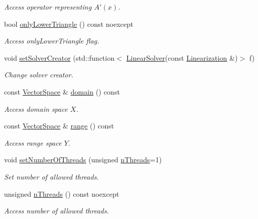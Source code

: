 \begin{DoxyCompactItemize}
\begin{DoxyCompactList}\small\item\em Access operator representing $A'(x)$. \end{DoxyCompactList}\item 
bool \hyperlink{classSpacy_1_1Kaskade_1_1C1Operator_adb85b50e1cc87fb342412560353c2f73_adb85b50e1cc87fb342412560353c2f73}{only\+Lower\+Triangle} () const noexcept
\begin{DoxyCompactList}\small\item\em Access only\+Lower\+Triangle flag. \end{DoxyCompactList}\item 
void \hyperlink{classSpacy_1_1Kaskade_1_1C1Operator_aa0c69955542db6b0f61807181874b4d9_aa0c69955542db6b0f61807181874b4d9}{set\+Solver\+Creator} (std\+::function$<$ \hyperlink{namespaceSpacy_a7d5cd1c6fb9dd85aa345b536caf30bba_a7d5cd1c6fb9dd85aa345b536caf30bba}{Linear\+Solver}(const \hyperlink{classSpacy_1_1Kaskade_1_1LinearOperator}{Linearization} \&)$>$ f)
\begin{DoxyCompactList}\small\item\em Change solver creator. \end{DoxyCompactList}\item 
const \hyperlink{classSpacy_1_1VectorSpace}{Vector\+Space} \& \hyperlink{classSpacy_1_1OperatorBase_a2588f9b3e0188820c4c494e63293dc6f_a2588f9b3e0188820c4c494e63293dc6f}{domain} () const 
\begin{DoxyCompactList}\small\item\em Access domain space $X$. \end{DoxyCompactList}\item 
const \hyperlink{classSpacy_1_1VectorSpace}{Vector\+Space} \& \hyperlink{classSpacy_1_1OperatorBase_ab19d3b7a6f290b1079248f1e567e53d6_ab19d3b7a6f290b1079248f1e567e53d6}{range} () const 
\begin{DoxyCompactList}\small\item\em Access range space $Y$. \end{DoxyCompactList}\item 
void \hyperlink{classSpacy_1_1Mixin_1_1NumberOfThreads_ab0c2fca77cb0d613e3bb8ce5bda11fdc_ab0c2fca77cb0d613e3bb8ce5bda11fdc}{set\+Number\+Of\+Threads} (unsigned \hyperlink{classSpacy_1_1Mixin_1_1NumberOfThreads_a385963b95b5e1ddf422393146cc71ee1_a385963b95b5e1ddf422393146cc71ee1}{n\+Threads}=1)
\begin{DoxyCompactList}\small\item\em Set number of allowed threads. \end{DoxyCompactList}\item 
unsigned \hyperlink{classSpacy_1_1Mixin_1_1NumberOfThreads_a385963b95b5e1ddf422393146cc71ee1_a385963b95b5e1ddf422393146cc71ee1}{n\+Threads} () const noexcept
\begin{DoxyCompactList}\small\item\em Access number of allowed threads. \end{DoxyCompactList}\end{DoxyCompactItemize}



